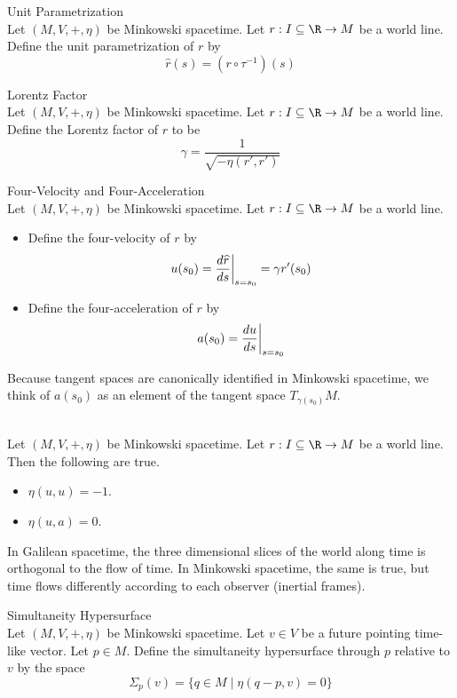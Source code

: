 \documentclass[a4paper]{article}
\begin{document}
\begin{defn}{Unit Parametrization}{}\\
Let $(M,V,+,\eta)$ be Minkowski spacetime. Let $r:I\subseteq\R\to M$ be a world line. Define the unit parametrization of $r$ by $$\widehat{r}(s)=(r\circ\tau^{-1})(s)$$
\end{defn}

\begin{defn}{Lorentz Factor}{}\\
Let $(M,V,+,\eta)$ be Minkowski spacetime. Let $r:I\subseteq\R\to M$ be a world line. Define the Lorentz factor of $r$ to be $$\gamma=\frac{1}{\sqrt{-\eta(r',r')}}$$
\end{defn}

\begin{defn}{Four-Velocity and Four-Acceleration}{}\\
Let $(M,V,+,\eta)$ be Minkowski spacetime. Let $r:I\subseteq\R\to M$ be a world line. 
\begin{itemize}
\item Define the four-velocity of $r$ by $$u(s_0)=\frac{d\widehat{r}}{ds}\bigg{|}_{s=s_0}=\gamma r'(s_0)$$
\item Define the four-acceleration of $r$ by $$a(s_0)=\frac{du}{ds}\bigg{|}_{s=s_0}$$
\end{itemize}
\end{defn}

Because tangent spaces are canonically identified in Minkowski spacetime, we think of $a(s_0)$ as an element of the tangent space $T_{\gamma(s_0)}M$. 

\begin{prp}{}{}\\
Let $(M,V,+,\eta)$ be Minkowski spacetime. Let $r:I\subseteq\R\to M$ be a world line. Then the following are true. 
\begin{itemize}
\item $\eta(u,u)=-1$. 
\item $\eta(u,a)=0$. 
\end{itemize}
\end{prp}

In Galilean spacetime, the three dimensional slices of the world along time is orthogonal to the flow of time. In Minkowski spacetime, the same is true, but time flows differently according to each observer (inertial frames). 

\begin{defn}{Simultaneity Hypersurface}{}\\
Let $(M,V,+,\eta)$ be Minkowski spacetime. Let $v\in V$ be a future pointing time-like vector. Let $p\in M$. Define the simultaneity hypersurface through $p$ relative to $v$ by the space $$\Sigma_p(v)=\{q\in M\;|\;\eta(q-p,v)=0\}$$
\end{defn}
\end{document}
